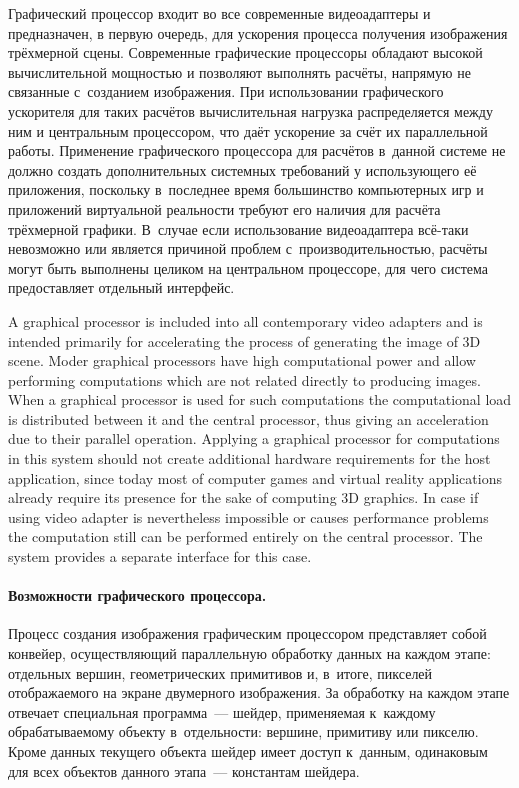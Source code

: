 \documentclass[a4paper, 12pt, titlepage]{extarticle}
\begin{document}
\begin{original}
        Графический процессор входит во все современные видеоадаптеры и предназначен, в
        первую очередь, для ускорения процесса получения изображения трёхмерной сцены. Современные
        графические процессоры обладают высокой вычислительной мощностью и позволяют выполнять
        расчёты, напрямую не связанные с~созданием изображения. При использовании графического
        ускорителя для таких расчётов вычислительная нагрузка распределяется между ним и центральным
        процессором, что даёт ускорение за счёт их параллельной работы. Применение графического
        процессора для расчётов в~данной системе не должно создать дополнительных системных
        требований у использующего её приложения, поскольку в~последнее время большинство компьютерных игр и
        приложений виртуальной реальности требуют его наличия для расчёта трёхмерной графики. В~случае если
        использование видеоадаптера всё-таки невозможно или является причиной проблем
        с~производительностью, расчёты могут быть выполнены целиком на центральном процессоре, для
        чего система предоставляет отдельный интерфейс.
\end{original}

        A graphical processor is included into all contemporary video adapters and is intended
        primarily for accelerating the process of generating the image of 3D scene. Moder graphical
        processors have high computational power and allow performing computations which are not
        related directly to producing images. When a graphical processor is used for such
        computations the computational load is distributed between it and the central processor,
        thus giving an acceleration due to their parallel operation. Applying a graphical processor
        for computations in this system should not create additional hardware requirements for the
        host application, since today most of computer games and virtual reality applications
        already require its presence for the sake of computing 3D graphics. In case if using video
        adapter is nevertheless impossible or causes performance problems the computation still can
        be performed entirely on the central processor. The system provides a separate interface for
        this case.

\begin{original}
        \paragraph{Возможности графического процессора.}
        Процесс создания изображения графическим процессором представляет собой конвейер,
        осуществляющий параллельную обработку данных на каждом этапе: отдельных вершин,
        геометрических примитивов и, в~итоге, пикселей отображаемого на экране двумерного
        изображения. За обработку на каждом этапе отвечает специальная программа~--- шейдер,
        применяемая к~каждому обрабатываемому объекту в~отдельности: вершине, примитиву или пикселю.
        Кроме данных текущего объекта шейдер имеет доступ к~данным, одинаковым для всех объектов
        данного этапа~--- константам шейдера.
\end{original}
\end{document}
